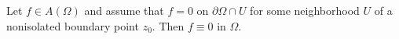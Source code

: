 
Let $f \in A(\Omega)$ and assume that $f = 0$ on $\partial \Omega \cap U$ for some neighborhood $U$ of a nonisolated boundary point $z_0$. Then $f \equiv 0$ in $\Omega$.
